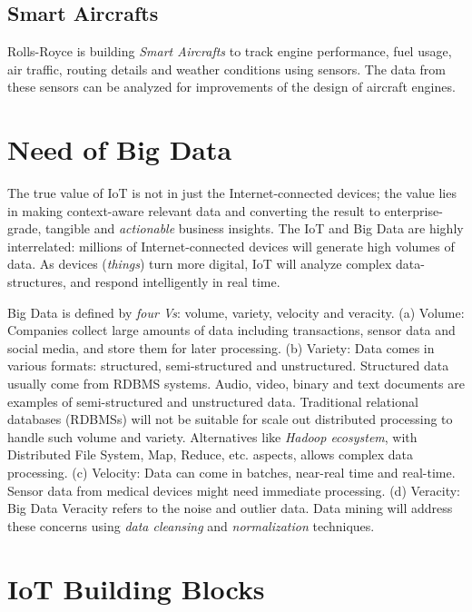 \documentclass[sigconf]{acmart}
\begin{document}
	\subsection{Smart Aircrafts}
	
	Rolls-Royce is building {\em Smart Aircrafts} to track engine performance, fuel usage, air traffic, routing details and weather conditions using sensors. The data from these sensors can be analyzed for improvements of the design of aircraft engines\cite{smart-aircraft}.
	
	\section{Need of Big Data}
	
	The true value of IoT is not in just the Internet-connected devices; the value lies in making context-aware relevant data and converting the result to enterprise-grade, tangible and {\em actionable} business insights. The IoT and Big Data are highly interrelated: millions of Internet-connected devices will generate high volumes of data. As devices ({\em things}) turn more digital, IoT will analyze complex data-structures, and respond intelligently in real time. 
	
	Big Data is defined by {\em four Vs}: volume, variety, velocity and veracity\cite{big-data}. (a) Volume: Companies collect large amounts of data including transactions, sensor data and social media, and store them for later processing. (b) Variety: Data comes in various formats: structured, semi-structured and unstructured. Structured data usually come from RDBMS systems. Audio, video, binary and text documents are examples of semi-structured and unstructured data. Traditional relational databases (RDBMSs) will not be suitable for scale out distributed processing to handle such volume and variety. Alternatives like {\em Hadoop ecosystem}, with Distributed File System, Map, Reduce, etc. aspects, allows complex data processing. (c) Velocity: Data can come in batches, near-real time and real-time. Sensor data from medical devices might need immediate processing. (d) Veracity: Big Data Veracity refers to the noise and outlier data. Data mining will address these concerns using {\em data cleansing} and {\em normalization} techniques.
	

	\section{IoT Building Blocks}
	
\end{document}
